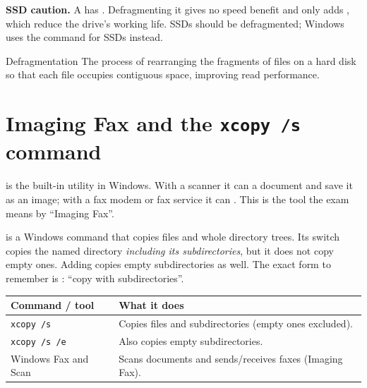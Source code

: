 \textbf{SSD caution.} A  has . Defragmenting it gives no speed benefit and only adds
, which reduce the drive's working life. SSDs should
 be defragmented; Windows uses the  command for SSDs
instead.

\begin{definitionbox}{Defragmentation}
The process of rearranging the fragments of files on a hard disk so that each
file occupies contiguous space, improving read performance.
\end{definitionbox}

\section{Imaging Fax and the \texttt{xcopy /s} command}
 is the built-in  utility in
Windows. With a scanner it can  a document and save it as an image;
with a fax modem or fax service it can . This is
the tool the exam means by ``Imaging Fax''.

 is a Windows  command that copies files and
whole directory trees. Its switch  copies the named directory
\emph{including its subdirectories}, but it does not copy empty ones. Adding
 copies empty subdirectories as well. The exact form to
remember is : ``copy with subdirectories''.

\begin{center}
\begin{tabular}{p{}p{}}
\toprule
\textbf{Command / tool} & \textbf{What it does} \\
\midrule
\texttt{xcopy /s} & Copies files and subdirectories (empty ones excluded). \\
\texttt{xcopy /s /e} & Also copies empty subdirectories. \\
Windows Fax and Scan & Scans documents and sends/receives faxes (Imaging Fax). \\
\bottomrule
\end{tabular}
\end{center}


